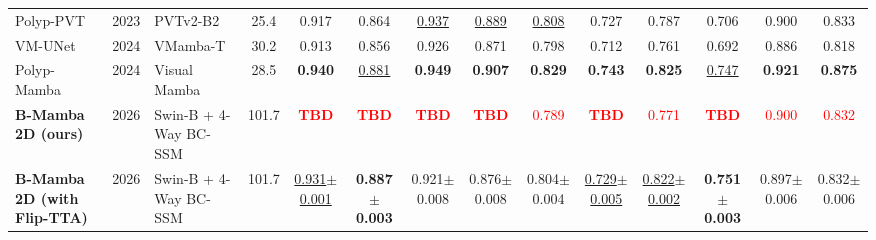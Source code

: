 \documentclass[journal]{IEEEtran}
\newcommand{\tbd}{\textcolor{red}{\textbf{TBD}}}
\newcommand{\prelim}[1]{\textcolor{red}{#1}}
\newcommand{\BMrow}{\tbd & \tbd & \tbd & \tbd & \prelim{0.789} & \tbd & \prelim{0.771} & \tbd & \prelim{0.900} & \prelim{0.832}}}
\begin{document}
\begin{table}[t]
\begin{adjustbox}{max width=\textwidth}
\begin{tabular}{l c l c cc cc cc cc cc}
Polyp-PVT \cite{dong2023polyppvt}       & 2023 & PVTv2-B2        & 25.4  & 0.917 & 0.864 & \underline{0.937} & \underline{0.889} & \underline{0.808} & 0.727 & 0.787 & 0.706 & 0.900 & 0.833 \\
VM-UNet \cite{ruan2024vmunet}           & 2024 & VMamba-T        & 30.2  & 0.913 & 0.856 & 0.926 & 0.871 & 0.798 & 0.712 & 0.761 & 0.692 & 0.886 & 0.818 \\
Polyp-Mamba \cite{xu2024polypmamba}     & 2024 & Visual Mamba    & 28.5  & \textbf{0.940} & \underline{0.881} & \textbf{0.949} & \textbf{0.907} & \textbf{0.829} & \textbf{0.743} & \textbf{0.825} & \underline{0.747} & \textbf{0.921} & \textbf{0.875} \\
\midrule
\textbf{B-Mamba 2D (ours)}                 & 2026 & Swin-B + 4-Way BC-SSM & 101.7 & \BMrow \\
\textbf{B-Mamba 2D (with Flip-TTA)}       & 2026 & Swin-B + 4-Way BC-SSM & 101.7 & \underline{0.931$\pm$0.001} & \textbf{0.887$\pm$0.003} & 0.921$\pm$0.008 & 0.876$\pm$0.008 & 0.804$\pm$0.004 & \underline{0.729$\pm$0.005} & \underline{0.822$\pm$0.002} & \textbf{0.751$\pm$0.003} & 0.897$\pm$0.006 & 0.832$\pm$0.006 \\
\bottomrule
\end{tabular}
\end{adjustbox}
\end{table}
\end{document}
